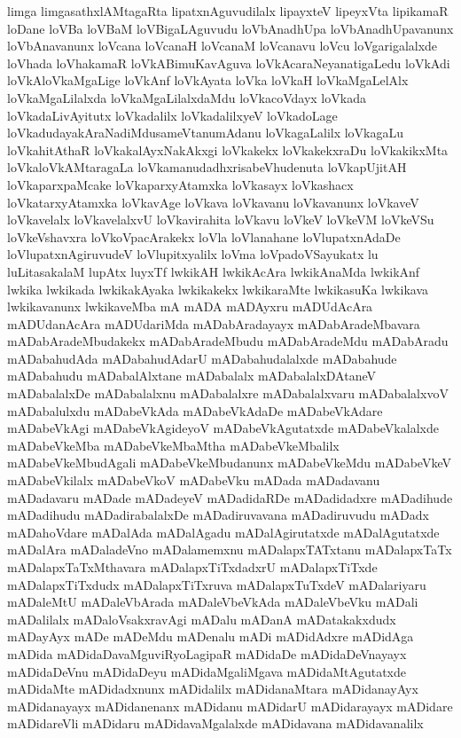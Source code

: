 {limga
limgasathxlAMtagaRta
lipatxnAguvudilalx
lipayxteV
lipeyxVta
lipikamaR
loDane
loVBa
loVBaM
loVBigaLAguvudu
loVbAnadhUpa
loVbAnadhUpavanunx
loVbAnavanunx
loVcana
loVcanaH
loVcanaM
loVcanavu
loVcu
loVgarigalalxde
loVhada
loVhakamaR
loVkABimuKavAguva
loVkAcaraNeyanatigaLedu
loVkAdi
loVkAloVkaMgaLige
loVkAnf
loVkAyata
loVka
loVkaH
loVkaMgaLelAlx
loVkaMgaLilalxda
loVkaMgaLilalxdaMdu
loVkacoVdayx
loVkada
loVkadaLivAyitutx
loVkadalilx
loVkadalilxyeV
loVkadoLage
loVkadudayakAraNadiMdusameVtanumAdanu
loVkagaLalilx
loVkagaLu
loVkahitAthaR
loVkakalAyxNakAkxgi
loVkakekx
loVkakekxraDu
loVkakikxMta
loVkaloVkAMtaragaLa
loVkamanudadhxrisabeVhudenuta
loVkapUjitAH
loVkaparxpaMcake
loVkaparxyAtamxka
loVkasayx
loVkashacx
loVkatarxyAtamxka
loVkavAge
loVkava
loVkavanu
loVkavanunx
loVkaveV
loVkavelalx
loVkavelalxvU
loVkavirahita
loVkavu
loVkeV
loVkeVM
loVkeVSu
loVkeVshavxra
loVkoVpacArakekx
loVla
loVlanahane
loVlupatxnAdaDe
loVlupatxnAgiruvudeV
loVlupitxyalilx
loVma
loVpadoVSayukatx
lu
luLitasakalaM
lupAtx
luyxTf
lwkikAH
lwkikAcAra
lwkikAnaMda
lwkikAnf
lwkika
lwkikada
lwkikakAyaka
lwkikakekx
lwkikaraMte
lwkikasuKa
lwkikava
lwkikavanunx
lwkikaveMba
mA
mADA
mADAyxru
mADUdAcAra
mADUdanAcAra
mADUdariMda
mADabAradayayx
mADabAradeMbavara
mADabAradeMbudakekx
mADabAradeMbudu
mADabAradeMdu
mADabAradu
mADabahudAda
mADabahudAdarU
mADabahudalalxde
mADabahude
mADabahudu
mADabalAlxtane
mADabalalx
mADabalalxDAtaneV
mADabalalxDe
mADabalalxnu
mADabalalxre
mADabalalxvaru
mADabalalxvoV
mADabalulxdu
mADabeVkAda
mADabeVkAdaDe
mADabeVkAdare
mADabeVkAgi
mADabeVkAgideyoV
mADabeVkAgutatxde
mADabeVkalalxde
mADabeVkeMba
mADabeVkeMbaMtha
mADabeVkeMbalilx
mADabeVkeMbudAgali
mADabeVkeMbudanunx
mADabeVkeMdu
mADabeVkeV
mADabeVkilalx
mADabeVkoV
mADabeVku
mADada
mADadavanu
mADadavaru
mADade
mADadeyeV
mADadidaRDe
mADadidadxre
mADadihude
mADadihudu
mADadirabalalxDe
mADadiruvavana
mADadiruvudu
mADadx
mADahoVdare
mADalAda
mADalAgadu
mADalAgirutatxde
mADalAgutatxde
mADalAra
mADaladeVno
mADalamemxnu
mADalapxTATxtanu
mADalapxTaTx
mADalapxTaTxMthavara
mADalapxTiTxdadxrU
mADalapxTiTxde
mADalapxTiTxdudx
mADalapxTiTxruva
mADalapxTuTxdeV
mADalariyaru
mADaleMtU
mADaleVbArada
mADaleVbeVkAda
mADaleVbeVku
mADali
mADalilalx
mADaloVsakxravAgi
mADalu
mADanA
mADatakakxdudx
mADayAyx
mADe
mADeMdu
mADenalu
mADi
mADidAdxre
mADidAga
mADida
mADidaDavaMguviRyoLagipaR
mADidaDe
mADidaDeVnayayx
mADidaDeVnu
mADidaDeyu
mADidaMgaliMgava
mADidaMtAgutatxde
mADidaMte
mADidadxnunx
mADidalilx
mADidanaMtara
mADidanayAyx
mADidanayayx
mADidanenanx
mADidanu
mADidarU
mADidarayayx
mADidare
mADidareVli
mADidaru
mADidavaMgalalxde
mADidavana
mADidavanalilx
}
